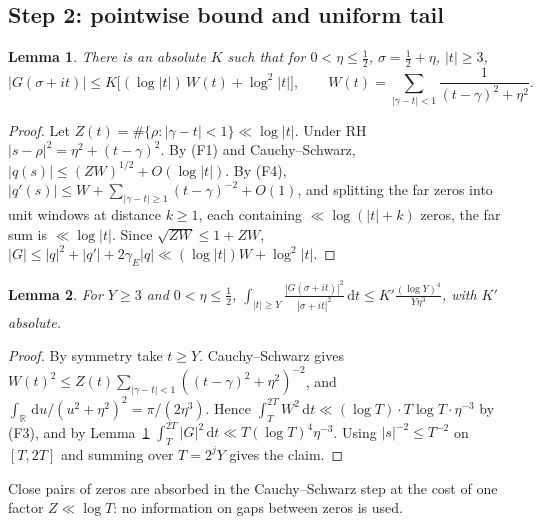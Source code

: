 \documentclass[11pt]{amsart}
\newtheorem{lemma}{Lemma}[section]
\theoremstyle{remark}
\theoremstyle{definition}
\newcommand{\gE}{\gamma_E}
\newcommand{\dd}{\,\mathrm{d}}
\begin{document}
\subsection*{Step 2: pointwise bound and uniform tail}
\begin{lemma}\label{lem:P}
There is an absolute $K$ such that for $0<\eta\le\frac12$, $\sigma=\frac12+\eta$, $|t|\ge3$,
\[
|G(\sigma+it)|\le K\big[(\log|t|)\,W(t)+\log^2|t|\big],\qquad W(t)=\sum_{|\gamma-t|<1}\frac1{(t-\gamma)^2+\eta^2}.
\]
\end{lemma}
\begin{proof}
Let $Z(t)=\#\{\rho:|\gamma-t|<1\}\ll\log|t|$. Under RH $|s-\rho|^2=\eta^2+(t-\gamma)^2$. By (F1) and Cauchy--Schwarz, $|q(s)|\le(ZW)^{1/2}+O(\log|t|)$. By (F4), $|q'(s)|\le W+\sum_{|\gamma-t|\ge1}(t-\gamma)^{-2}+O(1)$, and splitting the far zeros into unit windows at distance $k\ge1$, each containing $\ll\log(|t|+k)$ zeros, the far sum is $\ll\log|t|$. Since $\sqrt{ZW}\le1+ZW$, $|G|\le|q|^2+|q'|+2\gE|q|\ll(\log|t|)W+\log^2|t|$.
\end{proof}

\begin{lemma}\label{lem:T}
For $Y\ge3$ and $0<\eta\le\frac12$, $\displaystyle\int_{|t|\ge Y}\frac{|G(\sigma+it)|^2}{|\sigma+it|^2}\dd t\le K'\frac{(\log Y)^4}{Y\eta^3}$, with $K'$ absolute.
\end{lemma}
\begin{proof}
By symmetry take $t\ge Y$. Cauchy--Schwarz gives $W(t)^2\le Z(t)\sum_{|\gamma-t|<1}((t-\gamma)^2+\eta^2)^{-2}$, and $\int_{\mathbb R}\dd u/(u^2+\eta^2)^2=\pi/(2\eta^3)$. Hence $\int_T^{2T}W^2\dd t\ll(\log T)\cdot T\log T\cdot\eta^{-3}$ by (F3), and by Lemma~\ref{lem:P} $\int_T^{2T}|G|^2\dd t\ll T(\log T)^4\eta^{-3}$. Using $|s|^{-2}\le T^{-2}$ on $[T,2T]$ and summing over $T=2^jY$ gives the claim.
\end{proof}

Close pairs of zeros are absorbed in the Cauchy--Schwarz step at the cost of one factor $Z\ll\log T$: no information on gaps between zeros is used.
\end{document}
